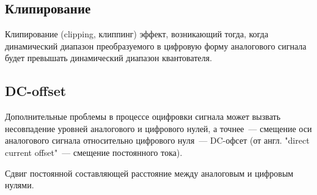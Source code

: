 \documentclass{beamer}
\begin{document}
\subsection{Клипирование}
\begin{frame}
\begin{block}{Клипирование (clipping, клиппинг)}
эффект, возникающий тогда, когда динамический диапазон преобразуемого в цифровую форму аналогового сигнала будет превышать динамический диапазон квантователя. 
\end{block}
\end{frame}

\subsection{DC-offset}
\begin{frame}
Дополнительные проблемы в процессе оцифровки сигнала может вызвать несовпадение уровней аналогового и цифрового нулей, а точнее~--- смещение оси аналогового сигнала относительно цифрового нуля~--- DC-офсет (от англ. "direct current offset"~--- смещение постоянного тока). 
\begin{block}{Сдвиг постоянной составляющей}
расстояние между аналоговым и цифровым нулями. 
\end{block}
\end{frame}
\end{document}
